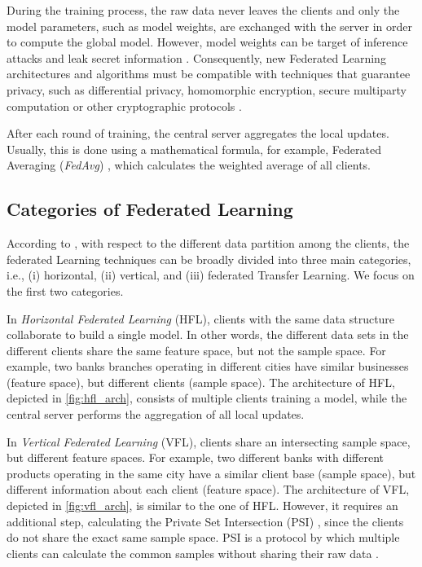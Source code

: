 During the training process, the raw data never leaves the clients and only the model parameters, such as model weights, are exchanged with the server in order to compute the global model. However, model weights can be target of inference attacks and leak secret information \cite{10.1145/3298981}.  Consequently, new Federated Learning architectures and algorithms must be compatible with techniques that guarantee privacy, such as differential privacy, homomorphic encryption, secure multiparty computation or other cryptographic protocols \cite{10.1145/3298981}.

After each round of training, the central server aggregates the local updates. Usually, this is done using a mathematical formula, for example, Federated Averaging (\textit{FedAvg}) \cite{10.48550/arxiv.1602.05629}, which calculates the weighted average of all clients.



\subsection{Categories of Federated Learning}\label{background:archfl}

According to \cite{10.1145/3298981, 10.1145/3412357}, with respect to the different data partition among the clients, the federated Learning techniques can be broadly divided into three main categories, i.e., (i) 
horizontal, (ii) vertical, and (iii) federated Transfer Learning. We focus on the first two categories.

In \textit{Horizontal Federated Learning} (HFL), clients with the same data structure collaborate to build a single model. In other words, the different data sets in the different clients share the same feature space, but not the sample space. For example, two banks branches operating in different cities have similar businesses (feature space), but different clients (sample space). The architecture of HFL, depicted in \autoref{fig:hfl_arch}, consists of multiple clients training a model, while the central server performs the aggregation of all local updates.

In \textit{Vertical Federated Learning} (VFL), clients share an intersecting sample space, but different feature spaces. For example, two different banks with different products operating in the same city have a similar client base (sample space), but different information about each client (feature space). The architecture of VFL, depicted in \autoref{fig:vfl_arch}, is similar to the one of HFL. However, it requires an additional step, calculating the Private Set Intersection (PSI) \cite{wei2022vertical}, since the clients do not share the exact same sample space. PSI is a protocol by which multiple clients can calculate the common samples without sharing their raw data \cite{wei2022vertical}.

